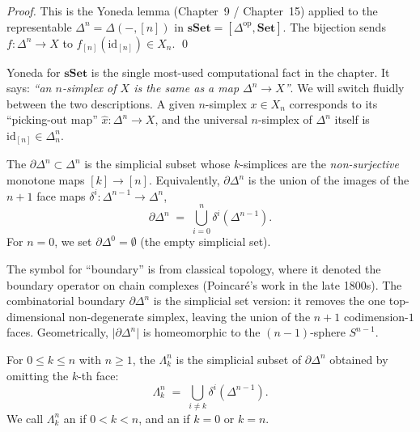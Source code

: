 \begin{proof}
This is the Yoneda lemma (Chapter~9 / Chapter~15) applied to the
representable $\Delta^n = \Delta(-, [n])$ in $\mathbf{sSet} =
[\Delta^{\mathrm{op}}, \mathbf{Set}]$. The bijection sends $f : \Delta^n
\to X$ to $f_{[n]}(\mathrm{id}_{[n]}) \in X_n$.
\qed
\end{proof}

\begin{readernote}
Yoneda for $\mathbf{sSet}$ is the single most-used computational fact
in the chapter. It says: \emph{``an $n$-simplex of $X$ is the same as a
map $\Delta^n \to X$''}. We will switch fluidly between the two
descriptions. A given $n$-simplex $x \in X_n$ corresponds to its
``picking-out map'' $\widehat{x} : \Delta^n \to X$, and the universal
$n$-simplex of $\Delta^n$ itself is $\mathrm{id}_{[n]} \in \Delta^n_n$.
\end{readernote}

\begin{definition}
\label{def:boundary}
The  $\partial\Delta^n \subset \Delta^n$ is the simplicial
subset whose $k$-simplices are the \emph{non-surjective} monotone maps
$[k] \to [n]$. Equivalently, $\partial\Delta^n$ is the union of the
images of the $n+1$ face maps $\delta^i : \Delta^{n-1} \to \Delta^n$,
\begin{equation*}
  \partial\Delta^n \;=\; \bigcup_{i=0}^{n} \delta^i(\Delta^{n-1}).
\end{equation*}
For $n = 0$, we set $\partial\Delta^0 = \emptyset$ (the empty simplicial set).
\end{definition}

\begin{nameorigin}
The symbol \term{$\partial$} for ``boundary'' is from classical topology,
where it denoted the boundary operator on chain complexes (Poincaré's
work in the late 1800s). The combinatorial boundary $\partial\Delta^n$ is
the simplicial set version: it removes the one top-dimensional
non-degenerate simplex, leaving the union of the $n+1$ codimension-$1$
faces. Geometrically, $\lvert\partial\Delta^n\rvert$ is homeomorphic to
the $(n-1)$-sphere $S^{n-1}$.
\end{nameorigin}

\begin{definition}
\label{def:horn}
For $0 \leq k \leq n$ with $n \geq 1$, the  $\Lambda^n_k$
is the simplicial subset of $\partial\Delta^n$ obtained by omitting the
$k$-th face:
\begin{equation*}
  \Lambda^n_k \;=\; \bigcup_{i \neq k} \delta^i(\Delta^{n-1}).
\end{equation*}
We call $\Lambda^n_k$ an  if $0 < k < n$, and an
 if $k = 0$ or $k = n$.
\end{definition}

